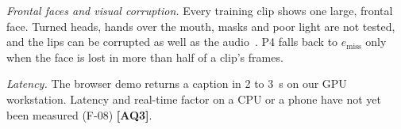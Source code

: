 \textit{Frontal faces and visual corruption.} Every training clip shows one large, frontal face.
Turned heads, hands over the mouth, masks and poor light are not tested, and the lips can be
corrupted as well as the audio~\cite{hong2023}. P4 falls back to $e_{\text{miss}}$ only when the face
is lost in more than half of a clip's frames.

\textit{Latency.} The browser demo returns a caption in 2 to 3~s on our GPU workstation. Latency and
real-time factor on a CPU or a phone have not yet been measured (F-08) \textbf{[AQ3]}.
